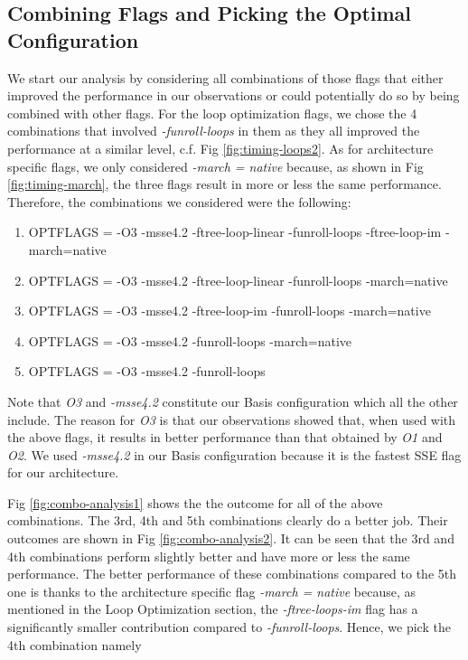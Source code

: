 \documentclass{article}
\begin{document}
\subsection{Combining Flags and Picking the Optimal Configuration}

We start our analysis by considering all combinations of those flags that either improved the performance in our observations or could potentially do so by being combined with other flags. For the loop optimization flags, we chose the 4 combinations that involved \textit{-funroll-loops} in them as they all improved the performance at a similar level, c.f. Fig \ref{fig:timing-loops2}. As for architecture specific flags, we only considered \textit{-march = native} because, as shown in Fig \ref{fig:timing-march}, the three flags result in more or less the same performance.  Therefore, the combinations we considered were the following:

\begin{enumerate}

\item OPTFLAGS = -O3 -msse4.2 -ftree-loop-linear -funroll-loops -ftree-loop-im -march=native

\item OPTFLAGS = -O3 -msse4.2 -ftree-loop-linear -funroll-loops -march=native

\item OPTFLAGS = -O3 -msse4.2 -ftree-loop-im -funroll-loops -march=native

\item OPTFLAGS = -O3 -msse4.2 -funroll-loops -march=native

\item OPTFLAGS = -O3 -msse4.2 -funroll-loops

\end{enumerate}

Note that \textit{O3} and \textit{-msse4.2} constitute our Basis configuration which all the other include. The reason for \textit{O3} is that our observations showed that, when used with the above flags, it results in better performance than that obtained by \textit{O1} and \textit{O2}. We used \textit{-msse4.2} in our Basis configuration because it is the fastest SSE flag for our architecture. 

 
Fig \ref{fig:combo-analysis1} shows the the outcome for all of the above combinations. The 3rd, 4th and 5th combinations clearly do a better job. Their outcomes are shown in Fig \ref{fig:combo-analysis2}. It can be seen that the 3rd  and 4th combinations perform slightly better and have more or less the same performance. The better performance of these combinations compared to the 5th one is thanks to the architecture specific flag \textit{-march = native} because, as mentioned in the Loop Optimization section, the \textit{-ftree-loops-im} flag has a significantly smaller contribution compared to \textit{-funroll-loops}. Hence, we pick the 4th combination namely
\end{document}
